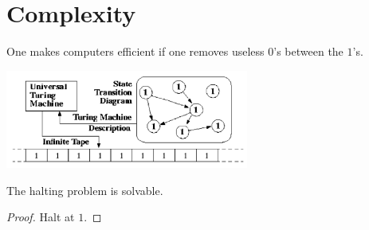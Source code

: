 \setcounter{section}{0}

\section{Complexity}
One makes computers efficient if one 
removes useless $0$'s between the $1$'s.\\
\vspace{-0.5cm}
\begin{center} 
  \includegraphics[width=0.6\textwidth]{turing_machine.png}
\end{center}
\begin{cor}
  The halting problem is solvable.
\end{cor}
\vspace{-0.2cm}
\begin{proof}
  Halt at $1$.
\end{proof}





%
%
%
